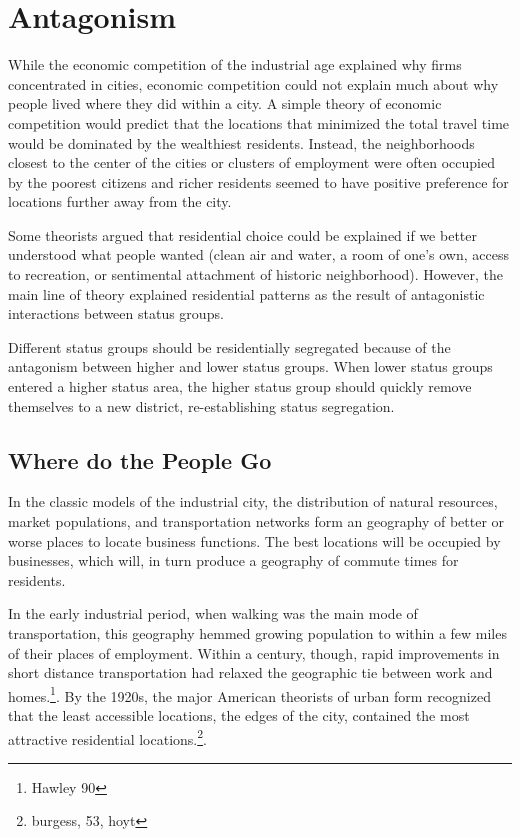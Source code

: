 \section*{Antagonism}
While the economic competition of the industrial age explained why
firms concentrated in cities, economic competition could not explain
much about why people lived where they did within a city. A simple
theory of economic competition would predict that the locations that
minimized the total travel time would be dominated by the
wealthiest residents. Instead, the neighborhoods closest to the center
of the cities or clusters of employment were often occupied by the
poorest citizens and richer residents seemed to have positive preference
for locations further away from the city.

Some theorists argued that residential choice could be explained
if we better understood what people wanted (clean air and
water, a room of one's own, access to recreation, or sentimental
attachment of historic neighborhood). However, the main line of theory
explained residential patterns as the result of antagonistic
interactions between status groups.

Different status groups should be residentially segregated because
of the antagonism between higher and lower status groups. When lower
status groups entered a higher status area, the higher status group
should quickly remove themselves to a new district, re-establishing
status segregation.

\subsection*{Where do the People Go}
In the classic models of the industrial city, the distribution of
natural resources, market populations, and transportation networks
form an geography of better or worse places to locate business
functions. The best locations will be occupied by businesses, which
will, in turn produce a geography of commute times for residents.

In the early industrial period, when walking was the main mode of
transportation, this geography hemmed growing population to within a
few miles of their places of employment. Within a century, though,
rapid improvements in short distance transportation had relaxed the
geographic tie between work and homes.\footnote{Hawley 90}. By
the 1920s, the major American theorists of urban form recognized that
the least accessible locations, the edges of the city, contained the
most attractive residential locations.\footnote{burgess, 53,
hoyt}. 

